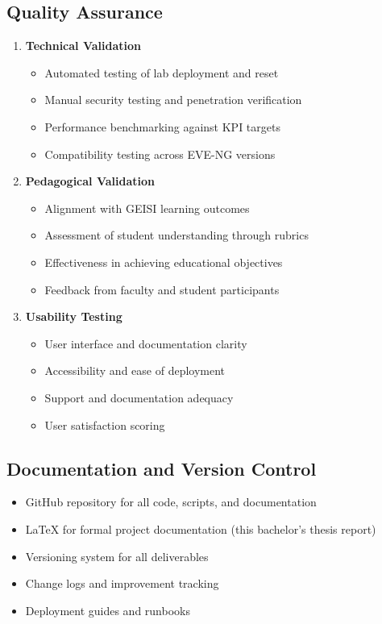 \subsection{Quality Assurance}

\begin{enumerate}

\item \textbf{Technical Validation}
\begin{itemize}
\item Automated testing of lab deployment and reset
\item Manual security testing and penetration verification
\item Performance benchmarking against KPI targets
\item Compatibility testing across EVE-NG versions
\end{itemize}

\item \textbf{Pedagogical Validation}
\begin{itemize}
\item Alignment with GEISI learning outcomes
\item Assessment of student understanding through rubrics
\item Effectiveness in achieving educational objectives
\item Feedback from faculty and student participants
\end{itemize}

\item \textbf{Usability Testing}
\begin{itemize}
\item User interface and documentation clarity
\item Accessibility and ease of deployment
\item Support and documentation adequacy
\item User satisfaction scoring
\end{itemize}

\end{enumerate}

\subsection{Documentation and Version Control}

\begin{itemize}

\item GitHub repository for all code, scripts, and documentation
\item LaTeX for formal project documentation (this bachelor's thesis report)
\item Versioning system for all deliverables
\item Change logs and improvement tracking
\item Deployment guides and runbooks

\end{itemize}


